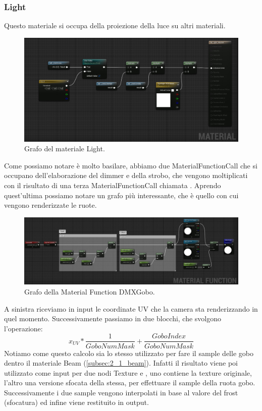 \documentclass[main.tex]{subfiles}
\begin{document}
\subsubsection{Light}\label{subsec:2_1_light}
Questo materiale si occupa della proiezione della luce su altri materiali.
\begin{figure}[H]
    \centering
    \includegraphics[width=1\linewidth]{img/renderingPipeline/LightMaterialFull.jpg}
    \caption{Grafo del materiale Light.}
    \label{fig:2_lightGraphFull}
\end{figure}
\noindent Come possiamo notare è molto basilare, abbiamo due MaterialFunctionCall che si occupano dell'elaborazione del dimmer e della strobo, che vengono moltiplicati con il risultato di una terza MaterialFunctionCall chiamata . Aprendo quest'ultima possiamo notare un grafo più interessante, che è quello con cui vengono renderizzate le ruote.
\begin{figure}[H]
    \centering
    \includegraphics[width=1\linewidth]{img/renderingPipeline/DMXGoboMFFull.jpg}
    \caption{Grafo della Material Function DMXGobo.}
    \label{fig:2_dmxGoboGraphFull}
\end{figure}
\noindent A sinistra riceviamo in input le coordinate UV che la camera sta renderizzando in quel momento. Successivamente passiamo in due blocchi, che svolgono l'operazione:
\[x_{UV} * \frac{1}{GoboNumMask} + \frac{GoboIndex}{GoboNumMask}\]
Notiamo come questo calcolo sia lo stesso utilizzato per fare il sample delle gobo dentro il materiale Beam (\ref{subsec:2_1_beam}). Infatti il risultato viene poi utilizzato come input per due nodi Texture  e , uno contiene la texture originale, l'altro una versione sfocata della stessa, per effettuare il sample della ruota gobo. Successivamente i due sample vengono interpolati in base al valore del frost (sfocatura) ed infine viene restituito in output.
\end{document}
